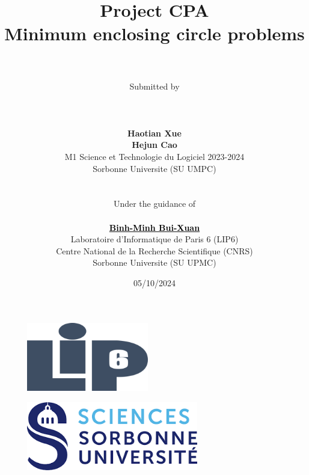 \documentclass[11pt,english]{article}
\begin{document}
\title
{
    \textbf{Project CPA \\ Minimum enclosing circle problems\\}
}

\author
{
    \\
    \\
    Submitted by
    \\
    \\
    \\
    \\
    \textbf{Haotian Xue}
    \\
    \textbf{Hejun Cao}
    \\
    M1 Science et Technologie du Logiciel 2023-2024
    \\
    Sorbonne Universite (SU UMPC)
    \\
    \\
    \\
    Under the guidance of 
    \\
    \\
    \textbf{\href{https://www-npa.lip6.fr/~buixuan/}{\textcolor{black}{Binh-Minh Bui-Xuan}}}
    \\
    Laboratoire d'Informatique de Paris 6 (LIP6)
    \\
    Centre National de la Recherche Scientifique (CNRS)
    \\
    Sorbonne Universite (SU UPMC)
}

\date{05/10/2024}

\maketitle

\begin{figure}[htbp]
    \begin{center}
        \includegraphics[height=3cm]{./src/logo_lip6.png}
    \end{center}
\end{figure}

\begin{figure}[htbp]
    \begin{center}
        \includegraphics[height=3cm]{./src/Science_Sorbonne_logo.png}
    \end{center}
\end{figure}
\end{document}

